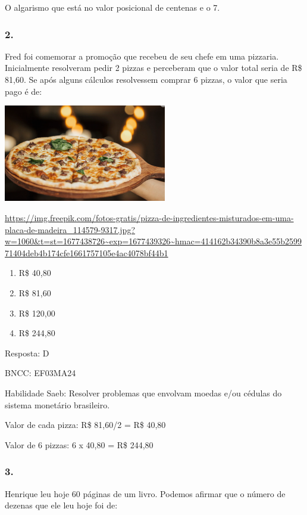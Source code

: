 O algarismo que está no valor posicional de centenas e o 7.

\subsubsection{2. }\label{section-172}

Fred foi comemorar a promoção que recebeu de seu chefe em uma pizzaria.
Inicialmente resolveram pedir 2 pizzas e perceberam que o valor total
seria de R\$ 81,60. Se após alguns cálculos resolvessem comprar 6
pizzas, o valor que seria pago é de:

\includegraphics[width=2.80000in,height=1.66867in]{media/image131.png}

\url{https://img.freepik.com/fotos-gratis/pizza-de-ingredientes-misturados-em-uma-placa-de-madeira_114579-9317.jpg?w=1060\&t=st=1677438726~exp=1677439326~hmac=414162b34390b8a3e55b259971404deb4b174cfe1661757105e4ac4078bf44b1}

\begin{enumerate}
\def\labelenumi{\alph{enumi})}
\item
  R\$ 40,80
\item
  R\$ 81,60
\item
  R\$ 120,00
\item
  R\$ 244,80
\end{enumerate}

Resposta: D

BNCC: EF03MA24

Habilidade Saeb: Resolver problemas que envolvam moedas e/ou cédulas do
sistema monetário brasileiro.

Valor de cada pizza: R\$ 81,60/2 = R\$ 40,80

Valor de 6 pizzas: 6 x 40,80 = R\$ 244,80

\subsubsection{3.}\label{section-173}

Henrique leu hoje 60 páginas de um livro. Podemos afirmar que o número
de dezenas que ele leu hoje foi de:

